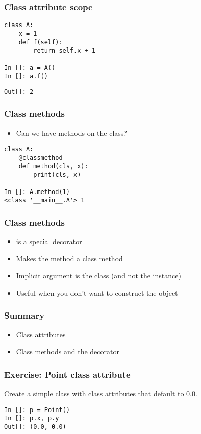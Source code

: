 \documentclass[14pt,compress,aspectratio=169]{beamer}
\begin{document}
\begin{frame}
  \frametitle{Class attribute scope}
\begin{lstlisting}
class A:
    x = 1
    def f(self):
        return self.x + 1

In []: a = A()
In []: a.f()
\end{lstlisting}
  \pause
\begin{lstlisting}
Out[]: 2
\end{lstlisting}
\end{frame}


\begin{frame}[fragile]
  \frametitle{Class methods}
  \begin{itemize}
  \item Can we have methods on the class?
  \end{itemize}
\begin{lstlisting}
class A:
    @classmethod
    def method(cls, x):
        print(cls, x)

In []: A.method(1)
<class '__main__.A'> 1
\end{lstlisting}
\end{frame}

\begin{frame}
  \frametitle{Class methods}
  \begin{itemize}
  \item {} is a special decorator
  \item Makes the method a class method
  \item Implicit argument is the class (and not the instance)
  \item Useful when you don't want to construct the object
  \end{itemize}
\end{frame}

\begin{frame}
  \frametitle{Summary}
  \begin{itemize}
  \item Class attributes
  \item Class methods and the  decorator
  \end{itemize}
\end{frame}


\begin{frame}
  \frametitle{Exercise: Point class attribute}
  \begin{block}{}
    Create a simple  class with class attributes  that
    default to 0.0.
  \end{block}

\begin{lstlisting}
In []: p = Point()
In []: p.x, p.y
Out[]: (0.0, 0.0)
\end{lstlisting}
\end{frame}
\end{document}
